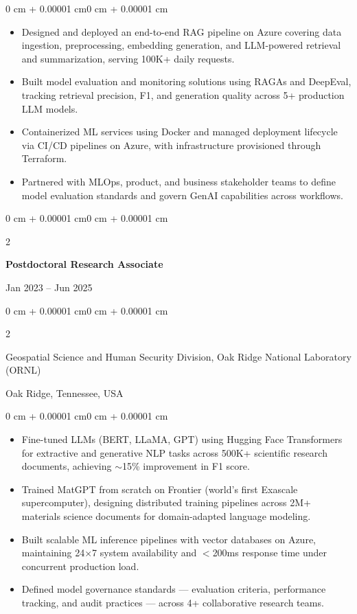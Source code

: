\documentclass[10pt, letterpaper]{article}
\newenvironment{highlights}{
    \begin{itemize}[topsep=0.10 cm, parsep=0.10 cm, partopsep=0pt, itemsep=0pt, leftmargin=0 cm + 10pt]
}{\end{itemize}}
\newenvironment{onecolentry}{
    \begin{adjustwidth}{0 cm + 0.00001 cm}{0 cm + 0.00001 cm}
}{\end{adjustwidth}}
\newenvironment{twocolentry}[2][]{
    \onecolentry
    \def\secondColumn{#2}
    \setcolumnwidth{\fill, 4.5 cm}
    \begin{paracol}{2}
}{
    \switchcolumn \raggedleft \secondColumn
    \end{paracol}
    \endonecolentry
}
\begin{document}
    \begin{onecolentry}
        \begin{highlights}
            \item Designed and deployed an end-to-end RAG pipeline on Azure covering data ingestion, preprocessing, embedding generation, and LLM-powered retrieval and summarization, serving 100K+ daily requests.
            \item Built model evaluation and monitoring solutions using RAGAs and DeepEval, tracking retrieval precision, F1, and generation quality across 5+ production LLM models.
            \item Containerized ML services using Docker and managed deployment lifecycle via CI/CD pipelines on Azure, with infrastructure provisioned through Terraform.
            \item Partnered with MLOps, product, and business stakeholder teams to define model evaluation standards and govern GenAI capabilities across workflows.
        \end{highlights}
    \end{onecolentry}

\vspace{1mm}

    \begin{twocolentry}{Jan 2023 -- Jun 2025}
        \textbf{Postdoctoral Research Associate}
    \end{twocolentry}
    \begin{twocolentry}{Oak Ridge, Tennessee, USA}
        Geospatial Science and Human Security Division, Oak Ridge National Laboratory (ORNL)
    \end{twocolentry}
    \vspace{0.10 cm}
    \begin{onecolentry}
        \begin{highlights}
            \item Fine-tuned LLMs (BERT, LLaMA, GPT) using Hugging Face Transformers for extractive and generative NLP tasks across 500K+ scientific research documents, achieving $\sim$15\% improvement in F1 score.
            \item Trained MatGPT from scratch on Frontier (world's first Exascale supercomputer), designing distributed training pipelines across 2M+ materials science documents for domain-adapted language modeling.
            \item Built scalable ML inference pipelines with vector databases on Azure, maintaining 24×7 system availability and $<$200ms response time under concurrent production load.
            \item Defined model governance standards — evaluation criteria, performance tracking, and audit practices — across 4+ collaborative research teams.
        \end{highlights}
    \end{onecolentry}
\end{document}
